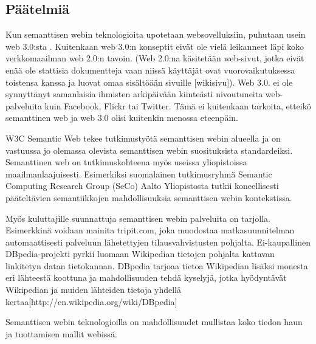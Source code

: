 \documentclass[finnish]{tktltiki2}
\theoremstyle{definition}
\theoremstyle{remark}
\begin{document}
\subsection{Päätelmiä}

Kun semanttisen webin teknologioita upotetaan websovelluksiin, puhutaan usein web 3.0:sta \cite{WEB3}. Kuitenkaan web 3.0:n konseptit eivät ole vielä leikanneet läpi koko verkkomaailman web 2.0:n tavoin. (Web 2.0:na käsitetään web-sivut, jotka eivät enää ole stattisia dokumentteja vaan niissä käyttäjät ovat vuorovaikutuksessa toistensa kanssa ja luovat omaa sisältöään sivuille [wikisivu]). Web 3.0. ei ole synnyttänyt samanlaisia ihmisten arkipäivään kiinteästi nivoutuneita  web-palveluita kuin Facebook, Flickr tai Twitter. Tämä ei kuitenkaan tarkoita, etteikö semanttinen web ja web 3.0 olisi kuitenkin menossa eteenpäin. 

W3C Semantic Web tekee tutkimustyötä semanttisen webin alueella ja on vastuussa jo olemassa olevista semanttisen webin suosituksista standardeiksi. Semanttinen web on tutkimuskohteena myös useissa yliopistoissa maailmanlaajuisesti. Esimerkiksi suomalainen tutkimusryhmä Semantic Computing Research Group (SeCo) Aalto Yliopistosta tutkii koneellisesti pääteltävien semantiikkojen mahdollisuuksia semanttisen webin kontekstissa.  

Myös kuluttajille suunnattuja semanttisen webin palveluita on tarjolla. Esimerkkinä voidaan mainita tripit.com, joka muodostaa matkasuunnitelman automaattisesti palveluun lähetettyjen tilausvahvistusten pohjalta. Ei-kaupallinen DBpedia-projekti pyrkii luomaan Wikipedian tietojen pohjalta kattavan linkitetyn datan tietokannan. DBpedia tarjoaa tietoa Wikipedian lisäksi monesta eri lähteestä koottuna ja mahdollisuuden tehdä kyselyjä, jotka hyödyntävät Wikipedian ja muiden lähteiden tietoja yhdellä kertaa[http://en.wikipedia.org/wiki/DBpedia] 

Semanttisen webin teknologioilla on mahdollisuudet mullistaa koko tiedon haun ja tuottamisen mallit webissä.  


%
%
% 
%
\newpage



\end{document}
